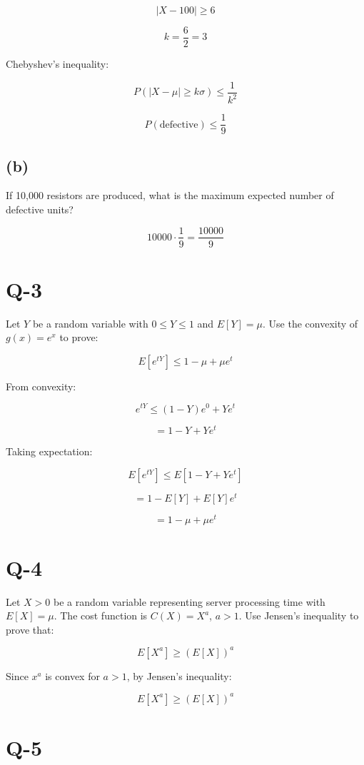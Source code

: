 \documentclass[12pt]{article}
\begin{document}
\[
|X - 100| \ge 6
\]

\[
k = \frac{6}{2} = 3
\]

Chebyshev’s inequality:

\[
P(|X - \mu| \ge k\sigma) \le \frac{1}{k^2}
\]

\[
P(\text{defective}) \le \frac{1}{9}
\]

\subsection*{(b)}

If 10,000 resistors are produced, what is the maximum expected number of defective units?

\[
10000 \cdot \frac{1}{9} = \frac{10000}{9}
\]

\section*{Q-3}

Let $Y$ be a random variable with $0 \le Y \le 1$ and $E[Y] = \mu$. Use the convexity of $g(x) = e^x$ to prove:

\[
E[e^{tY}] \le 1 - \mu + \mu e^t
\]

From convexity:

\[
e^{tY} \le (1 - Y)e^0 + Ye^t
\]

\[
= 1 - Y + Ye^t
\]

Taking expectation:

\[
E[e^{tY}] \le E[1 - Y + Ye^t]
\]

\[
= 1 - E[Y] + E[Y]e^t
\]

\[
= 1 - \mu + \mu e^t
\]

\section*{Q-4}

Let $X > 0$ be a random variable representing server processing time with $E[X] = \mu$. The cost function is $C(X) = X^a$, $a > 1$. Use Jensen’s inequality to prove that:

\[
E[X^a] \ge (E[X])^a
\]

Since $x^a$ is convex for $a > 1$, by Jensen’s inequality:

\[
E[X^a] \ge (E[X])^a
\]

\section*{Q-5}
\end{document}
